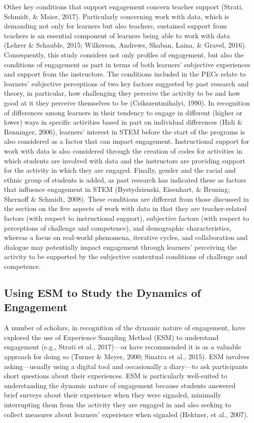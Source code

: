 \documentclass[]{msu-thesis}
\theoremstyle{definition}
\theoremstyle{definition}
\theoremstyle{definition}
\theoremstyle{remark}
\begin{document}
Other key conditions that support engagement concern teacher support
(Strati, Schmidt, \& Maier, 2017). Particularly concerning work with
data, which is demanding not only for learners but also teachers,
sustained support from teachers is an essential component of learners
being able to work with data (Lehrer \& Schauble, 2015; Wilkerson,
Andrews, Shaban, Laina, \& Gravel, 2016). Consequently, this study
considers not only profiles of engagement, but also the conditions of
engagement as part in terms of both learners' subjective experiences and
support from the instructors. The conditions included in the PECs relate
to learners' subjective perceptions of two key factors suggested by past
research and theory, in particular, how challenging they perceive the
activity to be and how good at it they perceive themselves to be
(Csikszentmihalyi, 1990). In recognition of differences among learners
in their tendency to engage in different (higher or lower) ways in
specific activities based in part on individual differences (Hidi \&
Renninger, 2006), learners' interest in STEM before the start of the
programs is also considered as a factor that can impact engagement.
Instructional support for work with data is also considered through the
creation of codes for activities in which students are involved with
data and the instructors are providing support for the activity in which
they are engaged. Finally, gender and the racial and ethnic group of
students is added, as past research has indicated these as factors that
influence engagement in STEM (Bystydzienski, Eisenhart, \& Bruning;
Shernoff \& Schmidt, 2008). These conditions are different from those
discussed in the section on the five aspects of work with data in that
they are teacher-related factors (with respect to instructional
support), subjective factors (with respect to perceptions of challenge
and competence), and demographic characteristics, whereas a focus on
real-world phenomena, iterative cycles, and collaboration and dialogue
may potentially impact engagement through learners' perceiving the
activity to be supported by the subjective contextual conditions of
challenge and competence.

\subsection{Using ESM to Study the Dynamics of
Engagement}\label{using-esm-to-study-the-dynamics-of-engagement}

A number of scholars, in recognition of the dynamic nature of
engagement, have explored the use of Experience Sampling Method (ESM) to
understand engagement (e.g., Strati et al., 2017)---or have recommended
it is as a valuable approach for doing so (Turner \& Meyer, 2000;
Sinatra et al., 2015). ESM involves asking---usually using a digital
tool and occasionally a diary---to ask participants short questions
about their experiences. ESM is particularly well-suited to
understanding the dynamic nature of engagement because students answered
brief surveys about their experience when they were signaled, minimally
interrupting them from the activity they are engaged in and also seeking
to collect measures about learners' experience when signaled (Hektner,
et al., 2007).
\end{document}
